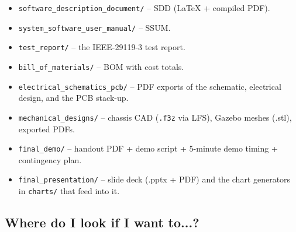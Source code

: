 \begin{itemize}
  \item \texttt{software\_description\_document/} -- SDD (LaTeX +
        compiled PDF).
  \item \texttt{system\_software\_user\_manual/} -- SSUM.
  \item \texttt{test\_report/} -- the IEEE-29119-3 test report.
  \item \texttt{bill\_of\_materials/} -- BOM with cost totals.
  \item \texttt{electrical\_schematics\_pcb/} -- PDF exports of the
        schematic, electrical design, and the PCB stack-up.
  \item \texttt{mechanical\_designs/} -- chassis CAD (\texttt{.f3z} via
        LFS), Gazebo meshes (.stl), exported PDFs.
  \item \texttt{final\_demo/} -- handout PDF + demo script + 5-minute
        demo timing + contingency plan.
  \item \texttt{final\_presentation/} -- slide deck (.pptx + PDF) and
        the chart generators in \texttt{charts/} that feed into it.
\end{itemize}

\subsection{Where do I look if I want to...?}
\label{section:lookup}


